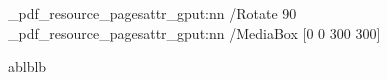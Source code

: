\documentclass{report}
\begin{document}
\ExplSyntaxOn
\driver_pdf_resource_pagesattr_gput:nn {/Rotate }{90}
\driver_pdf_resource_pagesattr_gput:nn {/MediaBox }{[0 0 300 300]}
\ExplSyntaxOff

ablblb
\end{document}
